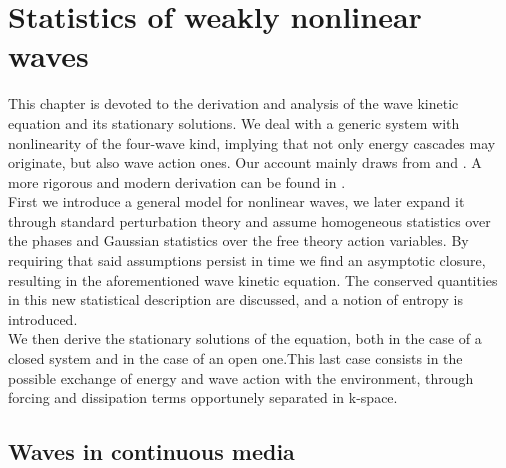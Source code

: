 \newpage
\phantom{}
\thispagestyle{empty}
\section{Statistics of weakly nonlinear waves}
This chapter is devoted to the derivation and analysis of the wave kinetic equation and its stationary solutions. We deal with a generic system with nonlinearity of the four-wave kind, implying that not only energy cascades may originate, but also wave action ones. Our account mainly draws from \cite{Onorato2020} and 
\cite{Zakharov}. A more rigorous and modern derivation can be found in \cite{Nazarenko2011}. \\
First we introduce a general model for nonlinear waves, we later expand it through standard perturbation theory and assume homogeneous statistics over the phases 
and Gaussian statistics over the free theory action variables. By requiring that said assumptions persist in time we find an asymptotic closure, 
resulting in the aforementioned wave kinetic equation. The conserved quantities in this new statistical description are discussed, and a notion of entropy is introduced. \\
We then derive the stationary solutions of the equation, both in the case of a closed system and  in the case of an open one.This last case consists in the possible exchange of energy 
and wave action with the environment, through forcing and dissipation terms opportunely separated in k-space.\\ 

\subsection{Waves in continuous media}

